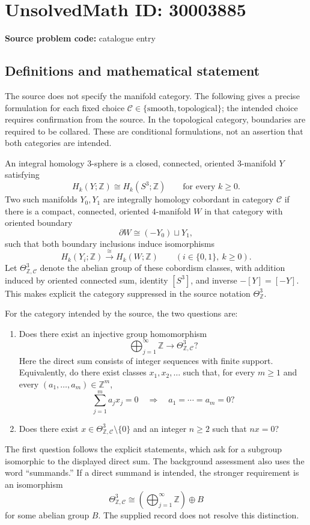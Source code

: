 \documentclass[11pt]{article}
\newcommand{\Z}{\mathbb{Z}}
\begin{document}
\section*{UnsolvedMath ID: 30003885}
\textbf{Source problem code:} catalogue entry
\subsection{Definitions and mathematical statement}
The source does not specify the manifold category. The following gives a precise formulation for each fixed choice \(\mathcal C\in\{\text{smooth},\text{topological}\}\); the intended choice requires confirmation from the source. In the topological category, boundaries are required to be collared. These are conditional formulations, not an assertion that both categories are intended.

An integral homology \(3\)-sphere is a closed, connected, oriented \(3\)-manifold \(Y\) satisfying
\[
H_k(Y;\Z)\cong H_k(S^3;\Z)\qquad\text{for every }k\geq 0.
\]
Two such manifolds \(Y_0,Y_1\) are integrally homology cobordant in category \(\mathcal C\) if there is a compact, connected, oriented \(4\)-manifold \(W\) in that category with oriented boundary
\[
\partial W\cong (-Y_0)\sqcup Y_1,
\]
such that both boundary inclusions induce isomorphisms
\[
H_k(Y_i;\Z)\xrightarrow{\ \cong\ }H_k(W;\Z)
\qquad(i\in\{0,1\},\ k\geq0).
\]
Let \(\Theta^3_{\Z,\mathcal C}\) denote the abelian group of these cobordism classes, with addition induced by oriented connected sum, identity \([S^3]\), and inverse \(-[Y]=[-Y]\). This makes explicit the category suppressed in the source notation \(\Theta^3_{\Z}\).

For the category intended by the source, the two questions are:
\begin{enumerate}
\item Does there exist an injective group homomorphism
\[
\bigoplus_{j=1}^{\infty}\Z\longrightarrow\Theta^3_{\Z,\mathcal C}?
\]
Here the direct sum consists of integer sequences with finite support. Equivalently, do there exist classes \(x_1,x_2,\ldots\) such that, for every \(m\geq1\) and every \((a_1,\ldots,a_m)\in\Z^m\),
\[
\sum_{j=1}^{m}a_jx_j=0\quad\Longrightarrow\quad a_1=\cdots=a_m=0?
\]
\item Does there exist \(x\in\Theta^3_{\Z,\mathcal C}\setminus\{0\}\) and an integer \(n\geq2\) such that \(nx=0\)?
\end{enumerate}
The first question follows the explicit statements, which ask for a subgroup isomorphic to the displayed direct sum. The background assessment also uses the word ``summands.'' If a direct summand is intended, the stronger requirement is an isomorphism
\[
\Theta^3_{\Z,\mathcal C}\cong\left(\bigoplus_{j=1}^{\infty}\Z\right)\oplus B
\]
for some abelian group \(B\). The supplied record does not resolve this distinction.
\end{document}
